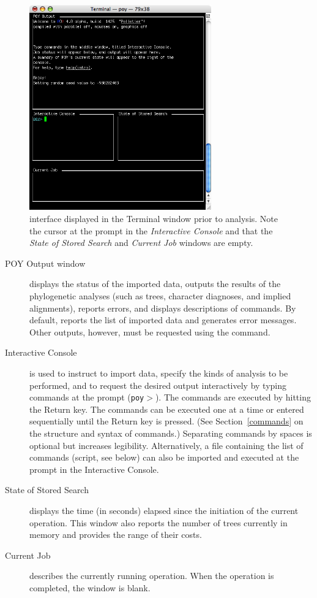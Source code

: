 \begin{figure}[htbp]
   \centering
   \includegraphics[width=0.7\textwidth]{figures/figinterface.jpg}
   \caption{\poy interface displayed in the Terminal window prior to analysis. Note the cursor at the \poy prompt in the \emph{Interactive Console} and that the \emph{State of Stored Search} and \emph{Current Job} windows are empty.}
   \label{fig:figinterface}
\end{figure}

\begin{description}
\item[POY Output window] displays the status of the imported data, outputs the results of the phylogenetic analyses (such as trees, character diagnoses, and implied alignments), reports errors, and displays descriptions of \poy commands. By default, \poy reports the list of imported data and generates error messages. Other outputs, however, must be requested using the  command.
\item[Interactive Console]  is used to instruct \poy to import data, specify the kinds of analysis to be performed, and to request the desired output interactively by typing \poy commands at the \poy prompt (\texttt{poy$>$}). The commands are executed by hitting the Return key. The commands can be executed one at a time or entered sequentially until the Return key is pressed. (See Section~\ref{commands} on the structure and syntax of \poy commands.) Separating commands by spaces is optional but increases legibility. Alternatively, a file containing the list of commands (\poy script, see below) can also be imported and executed at the prompt in the Interactive Console.
\item[State of Stored Search]  displays the time (in seconds) elapsed since the initiation of the current operation. This window also reports the number of trees currently in memory and provides the range of their costs.
\item[Current Job] describes the currently running operation. When the operation is completed, the window is blank.
\end{description} 

